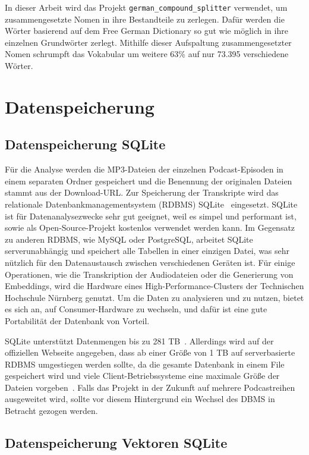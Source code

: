 In dieser Arbeit wird das Projekt \verb|german_compound_splitter|\cite{repodiac2023} verwendet, um zusammengesetzte Nomen in ihre Bestandteile zu zerlegen. 
Dafür werden die Wörter basierend auf dem Free German Dictionary\cite{2021} so gut wie möglich in ihre einzelnen Grundwörter zerlegt. 
Mithilfe dieser Aufspaltung zusammengesetzter Nomen schrumpft das Vokabular um weitere 63\% auf nur 73.395 verschiedene Wörter.


\section{Datenspeicherung}

\subsection{Datenspeicherung SQLite}

Für die Analyse werden die MP3-Dateien der einzelnen Podcast-Episoden in einem separaten Ordner gespeichert und die Benennung der originalen Dateien stammt aus der Download-URL.
Zur Speicherung der Transkripte wird das relationale Datenbankmanagementsystem (RDBMS) SQLite~\cite{zotero-553} eingesetzt. 
SQLite ist für Datenanalysezwecke sehr gut geeignet, weil es simpel und performant ist, sowie als Open-Source-Projekt kostenlos verwendet werden kann.
Im Gegensatz zu anderen RDBMS, wie MySQL oder PostgreSQL, arbeitet SQLite serverunabhängig und speichert alle Tabellen in einer einzigen Datei, was sehr nützlich für den Datenaustausch zwischen verschiedenen Geräten ist.
Für einige Operationen, wie die Transkription der Audiodateien oder die Generierung von Embeddings, wird die Hardware eines High-Performance-Clusters der Technischen Hochschule Nürnberg genutzt.
Um die Daten zu analysieren und zu nutzen, bietet es sich an, auf Consumer-Hardware zu wechseln, und dafür ist eine gute Portabilität der Datenbank von Vorteil.

SQLite unterstützt Datenmengen bis zu 281 TB~\cite{zotero-553}.
Allerdings wird auf der offiziellen Webseite angegeben, dass ab einer Größe von 1 TB auf serverbasierte RDBMS umgestiegen werden sollte, da die gesamte Datenbank in einem File gespeichert wird und viele Client-Betriebssysteme eine maximale Größe der Dateien vorgeben~\cite{zotero-553}.
Falls das Projekt in der Zukunft auf mehrere Podcastreihen ausgeweitet wird, sollte vor diesem Hintergrund ein Wechsel des DBMS in Betracht gezogen werden.

\subsection{Datenspeicherung Vektoren SQLite}


